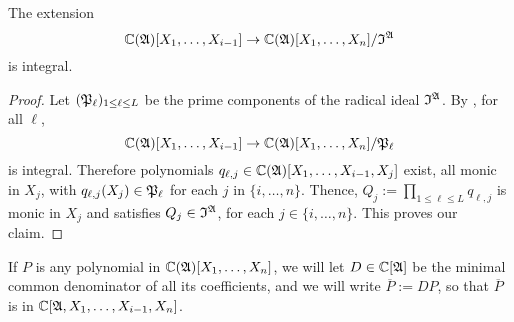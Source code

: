 \documentclass[sigconf]{acmart}
\def\C{\mathbb{C}}
\def\I{\frak{I}}
\def\A{\frak{A}}
\def\fp{\frak{P}}
\begin{document}
\begin{lemma} 
 The extension $$\C(\A)[X_1,\dots,X_{i-1}]\rightarrow
 \C(\A)[X_1,\dots,X_n]/\I^{\A}$$ is integral.
\end{lemma}
\begin{proof}
  Let $(\fp_\ell)_{1 \le \ell \leq L}$ be the prime components of
  the radical ideal $\I^\A$. By \cite[Proposition 1]{EMP}, for all
  $\ell$,
  \[
    \C(\A)[X_1,\dots,X_{i-1}]\rightarrow\C(\A)[X_1,\dots,X_n]/\fp_\ell
  \] 
  is integral. Therefore polynomials
  $q_{\ell,j}\in\C(\A)[X_1,\dots,X_{i-1},X_j]$ exist, all monic in
  $X_j$, with $q_{\ell,j}(X_j)\in \fp_\ell$ for each $j$ in
  $\{i,\hdots,n\}.$ Thence, $ Q_{j} := \prod_{1 \le \ell\le L}
  q_{\ell,j}$ is monic in $X_j$ and satisfies $ Q_{j} \in \I^\A$, for
  each $j \in \{i,\hdots,n\}.$ This proves our claim.
\end{proof}

\noindent
If $P$ is any polynomial in $\C(\frak A)[X_1,\dots,X_n]$, we will let
$D \in \C[\frak A]$ be the minimal common denominator of all its
coefficients, and we will write $\overline P := D P$, so that
$\overline P$ is in $\C[\A,X_1,\dots,X_{i-1},X_n]$.
\end{document}
